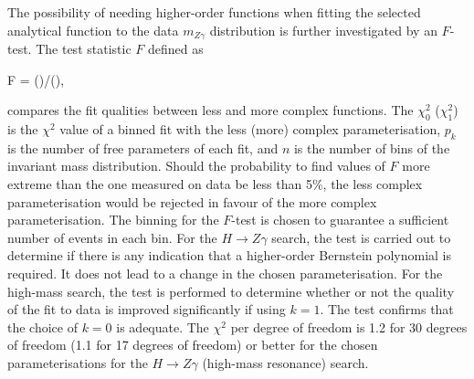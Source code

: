 The possibility of needing higher-order functions when fitting
the selected analytical function to the data $m_{Z\gamma}$ distribution
is further investigated by an $F$-test. The test statistic $F$ defined as

\beq
F = \left(\right)/\left(\right),
\eeq

compares the fit qualities between less and more complex functions.
The $\chi^2_0$ ($\chi^2_1$) is the $\chi^2$ value of a binned fit with the less (more) complex parameterisation,
$p_k$ is the number of free parameters of each fit, and $n$ is the number of bins of the invariant 
mass distribution. Should the probability to find values of $F$ more extreme than the one measured on data 
be less than 5\%, the less complex parameterisation would be rejected in favour of the more complex
parameterisation. 
The binning for the $F$-test is chosen to guarantee a sufficient number of events in
each bin.
For the $H\to Z\gamma$ search, the test is carried out to determine if there is
any indication that a higher-order Bernstein polynomial is required. 
It does not lead to a change in the chosen parameterisation.
For the high-mass search, the test is
performed to determine whether or not the quality of the fit to data is improved significantly if 
using $k=1$. 
The test confirms that the choice of $k=0$ is adequate. The $\chi^2$ per degree of freedom is 1.2 for 30
degrees of freedom (1.1 for 17 degrees of freedom) or better for the chosen parameterisations 
for the $H\to Z\gamma$ (high-mass resonance) search. 

